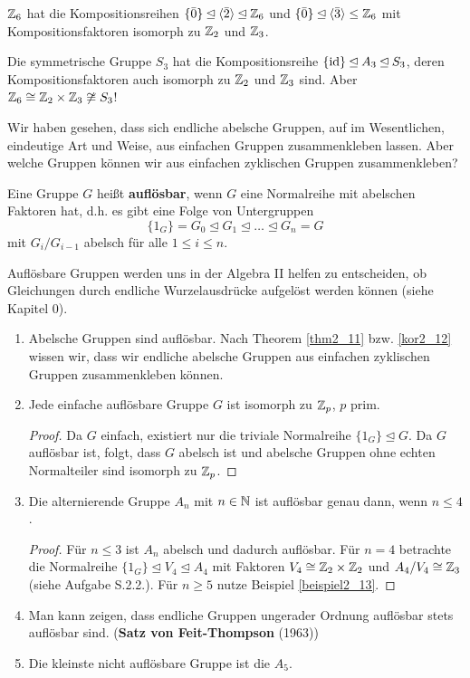 \begin{beispiel}
	$\mathbb{Z}_6$ hat die Kompositionsreihen $\{\bar{0}\} \unlhd \langle \bar{2} \rangle \unlhd \mathbb{Z}_6$ und $\{\bar{0}\} \unlhd \langle \bar{3} \rangle \leq \mathbb{Z}_6$ mit Kompositionsfaktoren isomorph zu $\mathbb{Z}_2$ und $\mathbb{Z}_3$.
	
	Die symmetrische Gruppe $S_3$ hat die Kompositionsreihe $\{\mathrm{id}\} \unlhd A_3 \unlhd S_3$, deren Kompositionsfaktoren auch isomorph zu $\mathbb{Z}_2$ und $\mathbb{Z}_3$ sind. Aber $\mathbb{Z}_6 \cong \mathbb{Z}_2 \times \mathbb{Z}_3 \not\cong S_3$!
\end{beispiel}
Wir haben gesehen, dass sich endliche abelsche Gruppen, auf im Wesentlichen, eindeutige Art und Weise, aus einfachen Gruppen zusammenkleben lassen. Aber welche Gruppen können wir aus einfachen zyklischen Gruppen zusammenkleben?
\begin{definition}
	Eine Gruppe $G$ heißt \textbf{auflösbar}, wenn $G$ eine Normalreihe mit abelschen Faktoren hat, d.h. es gibt eine Folge von Untergruppen
	\[\{1_G\} = G_0 \unlhd G_1 \unlhd \dots \unlhd G_n = G\]
	mit $G_i/G_{i-1}$ abelsch für alle $1 \leq i \leq n$.
\end{definition}
\begin{rem}
	Auflösbare Gruppen werden uns in der Algebra II helfen zu entscheiden, ob Gleichungen durch endliche Wurzelausdrücke aufgelöst werden können (siehe Kapitel 0).
\end{rem}
\begin{beispiel}\label{beispiel2_20}
	\begin{enumerate}[label=(\arabic*)]
		\item Abelsche Gruppen sind auflösbar. Nach Theorem \ref{thm2_11} bzw. \ref{kor2_12} wissen wir, dass wir endliche abelsche Gruppen aus einfachen zyklischen Gruppen zusammenkleben können.
		\item Jede einfache auflösbare Gruppe $G$ ist isomorph zu $\mathbb{Z}_p$, $p$ prim.
		\begin{proof}
			Da $G$ einfach, existiert nur die triviale Normalreihe $\{1_G\} \unlhd G$. Da $G$ auflösbar ist, folgt, dass $G$ abelsch ist und abelsche Gruppen ohne echten Normalteiler sind isomorph zu $\mathbb{Z}_p$.
		\end{proof}
		\item Die alternierende Gruppe $A_n$ mit $n \in \mathbb{N}$ ist auflösbar genau dann, wenn $n \leq 4$.
		\begin{proof}
			Für $n \leq 3$ ist $A_n$ abelsch und dadurch auflösbar. Für $n = 4$ betrachte die Normalreihe $\{1_G\} \unlhd V_4 \unlhd A_4$ mit Faktoren $V_4 \cong \mathbb{Z}_2 \times \mathbb{Z}_2$ und $A_4 / V_4 \cong \mathbb{Z}_3$ (siehe Aufgabe S.2.2.). Für $n \geq 5$ nutze Beispiel \ref{beispiel2_13}.
		\end{proof}
		\item Man kann zeigen, dass endliche Gruppen ungerader Ordnung auflösbar stets auflösbar sind. (\textbf{Satz von Feit-Thompson} (1963))
		\item Die kleinste nicht auflösbare Gruppe ist die $A_5$.
	\end{enumerate}
\end{beispiel}
